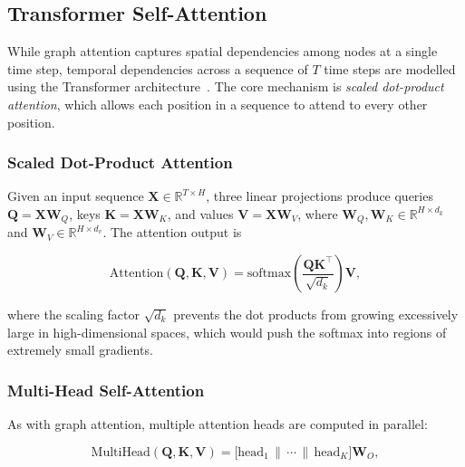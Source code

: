 \subsection{Transformer Self-Attention}
\label{subsec:meth-transformer}

While graph attention captures spatial dependencies among nodes at a single time step, temporal dependencies across a sequence of $T$ time steps are modelled using the Transformer architecture~\cite{vaswaniAttentionAllYou2017}. The core mechanism is \emph{scaled dot-product attention}, which allows each position in a sequence to attend to every other position.

\subsubsection{Scaled Dot-Product Attention}

Given an input sequence $\mathbf{X} \in \mathbb{R}^{T \times H}$, three linear projections produce queries $\mathbf{Q} = \mathbf{X}\mathbf{W}_Q$, keys $\mathbf{K} = \mathbf{X}\mathbf{W}_K$, and values $\mathbf{V} = \mathbf{X}\mathbf{W}_V$, where $\mathbf{W}_Q, \mathbf{W}_K \in \mathbb{R}^{H \times d_k}$ and $\mathbf{W}_V \in \mathbb{R}^{H \times d_v}$. The attention output is

\begin{equation}
    \text{Attention}(\mathbf{Q}, \mathbf{K}, \mathbf{V}) = \text{softmax}\!\left(\frac{\mathbf{Q}\mathbf{K}^{\top}}{\sqrt{d_k}}\right)\mathbf{V},
    \label{eq:scaled-dot-product}
\end{equation}

\noindent where the scaling factor $\sqrt{d_k}$ prevents the dot products from growing excessively large in high-dimensional spaces, which would push the softmax into regions of extremely small gradients.

\subsubsection{Multi-Head Self-Attention}

As with graph attention, multiple attention heads are computed in parallel:

\begin{equation}
    \text{MultiHead}(\mathbf{Q}, \mathbf{K}, \mathbf{V}) = \bigl[\text{head}_1 \,\|\, \cdots \,\|\, \text{head}_K\bigr]\mathbf{W}_O,
    \label{eq:multihead}
\end{equation}

